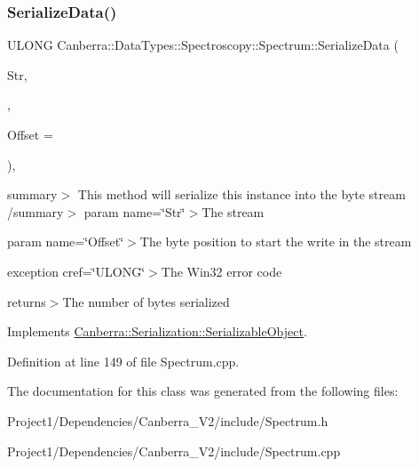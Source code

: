 \subsubsection{\texorpdfstring{Serialize\+Data()}{SerializeData()}}
{\footnotesize\ttfamily U\+L\+O\+NG Canberra\+::\+Data\+Types\+::\+Spectroscopy\+::\+Spectrum\+::\+Serialize\+Data (\begin{DoxyParamCaption}\item[{\hyperlink{class_canberra_1_1_utility_1_1_core_1_1_byte_stream}{Canberra\+::\+Utility\+::\+Core\+::\+Byte\+Stream} \&}]{Str,  }\item[{const \hyperlink{class_canberra_1_1_serialization_1_1_meta_data}{Canberra\+::\+Serialization\+::\+Meta\+Data} \&}]{,  }\item[{const L\+O\+NG}]{Offset = {} }\end{DoxyParamCaption})\hspace{0.3cm}{\ttfamily [protected]}, {\ttfamily [virtual]}}

summary$>$ This method will serialize this instance into the byte stream /summary$>$ param name=\char`\"{}\+Str\char`\"{}$>$The stream

param name=\char`\"{}\+Offset\char`\"{}$>$The byte position to start the write in the stream

exception cref=\char`\"{}\+U\+L\+O\+N\+G\char`\"{}$>$The Win32 error code

returns$>$The number of bytes serialized

Implements \hyperlink{class_canberra_1_1_serialization_1_1_serializable_object}{Canberra\+::\+Serialization\+::\+Serializable\+Object}.



Definition at line 149 of file Spectrum.\+cpp.



The documentation for this class was generated from the following files\+:\begin{DoxyCompactItemize}
\item 
Project1/\+Dependencies/\+Canberra\+\_\+\+V2/include/Spectrum.\+h\item 
Project1/\+Dependencies/\+Canberra\+\_\+\+V2/include/Spectrum.\+cpp\end{DoxyCompactItemize}
